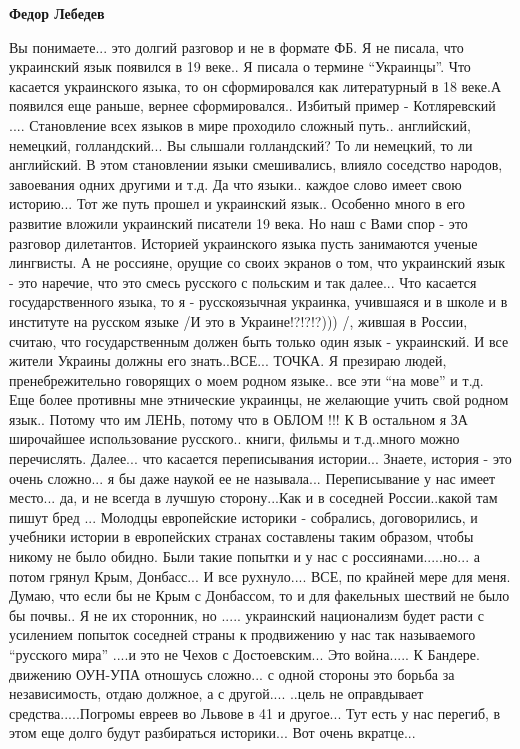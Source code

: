 \begin{itemize}
\begin{itemize}
\begin{itemize} %
\textbf{Федор Лебедев} 

Вы понимаете... это долгий разговор и не в формате ФБ. Я не писала, что
украинский язык появился в 19 веке.. Я писала о термине \enquote{Украинцы}. Что
касается украинского языка, то он сформировался как литературный в 18 веке.А
появился еще раньше, вернее сформировался.. Избитый пример - Котляревский
.... Становление всех языков в мире проходило сложный путь.. английский,
немецкий, голландский... Вы слышали голландский? То ли немецкий, то ли
английский. В этом становлении языки смешивались, влияло соседство народов,
завоевания одних другими и т.д. Да что языки.. каждое слово имеет свою
историю... Тот же путь прошел и украинский язык.. Особенно много в его развитие
вложили украинский писатели 19 века. Но наш с Вами спор - это разговор
дилетантов. Историей украинского языка пусть занимаются ученые лингвисты. А не
россияне, орущие со своих экранов о том, что украинский язык - это наречие, что
это смесь русского с польским и так далее... Что касается государственного
языка, то я - русскоязычная украинка, учившаяся и в школе и в институте на
русском языке /И это в Украине!?!?!?))) /, жившая в России, считаю, что
государственным должен быть только один язык - украинский. И все жители Украины
должны его знать..ВСЕ... ТОЧКА. Я презираю людей, пренебрежительно говорящих о
моем родном языке.. все эти \enquote{на мове} и т.д. Еще более противны мне этнические
украинцы, не желающие учить свой родном язык.. Потому что им ЛЕНЬ, потому что в
ОБЛОМ !!! К В остальном я ЗА широчайшее использование русского.. книги, фильмы
и т.д..много можно перечислять. Далее... что касается переписывания истории...
Знаете, история - это очень сложно... я бы даже наукой ее не
называла... Переписывание у нас имеет место... да, и не всегда в лучшую
сторону...Как и в соседней России..какой там пишут бред ... Молодцы европейские
историки - собрались, договорились, и учебники истории в европейских странах
составлены таким образом, чтобы никому не было обидно. Были такие попытки и у
нас с россиянами.....но... а потом грянул Крым, Донбасс... И все
рухнуло.... ВСЕ, по крайней мере для меня. Думаю, что если бы не Крым с
Донбассом, то и для факельных шествий не было бы почвы.. Я не их сторонник, но
..... украинский национализм будет расти с усилением попыток соседней страны к
продвижению у нас так называемого \enquote{русского мира} ....и это не Чехов с
Достоевским... Это война..... К Бандере. движению ОУН-УПА отношусь сложно... с
одной стороны это борьба за независимость, отдаю должное, а с другой.... ..цель
не оправдывает средства.....Погромы евреев во Львове в 41 и другое... Тут есть
у нас перегиб, в этом еще долго будут разбираться историки... Вот очень
вкратце...


\end{itemize}
\end{itemize}
\end{itemize}
